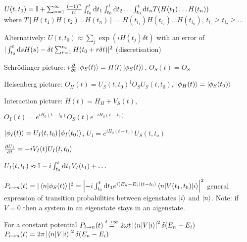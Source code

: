 \begin{squishlist}
    \item $U(t,t_0) = \id + \sum_{n=1}^\infty \frac{(-1)^n}{n!} \int_{t_0}^t \ud t_1 \int_{t_0}^t \ud t_2 \ldots \int_{t_0}^t \ud t_n T(H(t_1)\ldots H(t_n))$\\
    where $T[H(t_1)H(t_2)\ldots H(t_n)] = H(t_{i_1})H(t_{i_2})\ldots H(t_{i_n}),\, t_{i_1} \geq t_{i_2} \geq \ldots$
    \item Alternatively: $U(t,t_0) \approx \sum_j \exp(i H(t_j) \delta t)$ with an error of \\
    $|\int_{t_0}^t \ud s H(s) - \delta t \sum_{r=1}^{n_t} H(t_0 + r \delta t)|^2$ (discretisation)
\end{squishlist}

\begin{squishlist}
    \item Schrödinger picture: $i \D{t}{}\ket{\phi_S(t)} = H(t) \ket{\phi_S(t)}$, \quad $O_S(t) = O_S$
    \item Heisenberg picture: $O_H(t) = U_S(t,t_0)^{\dagger} O_S U_S(t,t_0)$, \quad $\ket{\phi_H(t)} = \ket{\phi_S(t_0)}$
    \item Interaction picture: $H(t) = H_H + V_S(t)$, 
    \item $O_I(t) = e^{iH_0(t-t_0)}O_S(t)e^{-iH_0(t-t_0)}$
    \item $\ket{\phi_I(t)} = U_I(t,t_0) \ket{\phi_I(t_0)}$, \quad $U_I = e^{iH_0(t-t_0)} U_S(t,t_o)$
    \item $\D{t}{U_I} = -i V_I(t) U_I(t,t_0)$
\end{squishlist}

\begin{squishlist}
    \item $U_I(t,t_0) \approx \id -i \int_{t_0}^t \ud t_1 V_I(t_1) + \ldots$
    \item $P_{i\rightarrow n}(t) = |\braket{n|\phi_S(t)}|^2 = \left| -i \int_{t_0}^t \ud t_1 e^{i(E_n-E_i)(t-t_0)} \braket{n|V(t_1,t_0)|i}\right|^2$ general expression of transition probabilities between eigenstates $\ket{i}$ and $\ket{n}$. Note: if $V=0$ then a system in an eigenstate stays in an aigenstate.
    \item For a constant potential $P_{i\rightarrow n}(t) \overset{t\rightarrow \infty}{=} 2 \omega t \left|\braket{n|V|i}\right|^2 \delta(E_n - E_i)$ \\
    $P_{i\rightarrow n}(t) =2 \pi \left|\braket{n|V|i}\right|^2 \delta(E_n - E_i)$
\end{squishlist}


